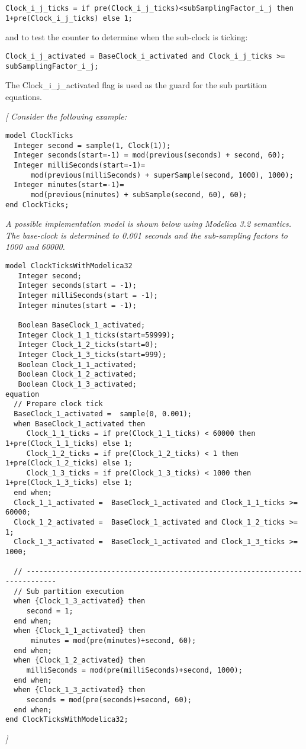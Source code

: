 \begin{lstlisting}[language=modelica]
Clock_i_j_ticks = if pre(Clock_i_j_ticks)<subSamplingFactor_i_j then 1+pre(Clock_i_j_ticks) else 1;
\end{lstlisting}

and to test the counter to determine when the sub-clock is ticking:
\begin{lstlisting}[language=modelica]
Clock_i_j_activated = BaseClock_i_activated and Clock_i_j_ticks >= subSamplingFactor_i_j;
\end{lstlisting}
The Clock\_i\_j\_activated flag is used as the guard for the sub
partition equations.

\emph{{[} Consider the following example:}

\begin{lstlisting}[language=modelica]
model ClockTicks
  Integer second = sample(1, Clock(1));
  Integer seconds(start=-1) = mod(previous(seconds) + second, 60);
  Integer milliSeconds(start=-1)=
      mod(previous(milliSeconds) + superSample(second, 1000), 1000);
  Integer minutes(start=-1)=
      mod(previous(minutes) + subSample(second, 60), 60);
end ClockTicks;
\end{lstlisting}

\emph{A possible implementation model is shown below using Modelica 3.2
semantics. The base-clock is determined to 0.001 seconds and the
sub-sampling factors to 1000 and 60000.}

\begin{lstlisting}[language=modelica]
model ClockTicksWithModelica32
   Integer second;
   Integer seconds(start = -1);
   Integer milliSeconds(start = -1);
   Integer minutes(start = -1);  

   Boolean BaseClock_1_activated;
   Integer Clock_1_1_ticks(start=59999);
   Integer Clock_1_2_ticks(start=0);
   Integer Clock_1_3_ticks(start=999);
   Boolean Clock_1_1_activated;
   Boolean Clock_1_2_activated;
   Boolean Clock_1_3_activated; 
equation  
  // Prepare clock tick   
  BaseClock_1_activated =  sample(0, 0.001);
  when BaseClock_1_activated then
     Clock_1_1_ticks = if pre(Clock_1_1_ticks) < 60000 then 1+pre(Clock_1_1_ticks) else 1;
     Clock_1_2_ticks = if pre(Clock_1_2_ticks) < 1 then 1+pre(Clock_1_2_ticks) else 1;
     Clock_1_3_ticks = if pre(Clock_1_3_ticks) < 1000 then 1+pre(Clock_1_3_ticks) else 1;
  end when;
  Clock_1_1_activated =  BaseClock_1_activated and Clock_1_1_ticks >= 60000;
  Clock_1_2_activated =  BaseClock_1_activated and Clock_1_2_ticks >= 1;
  Clock_1_3_activated =  BaseClock_1_activated and Clock_1_3_ticks >= 1000; 
 
  // ----------------------------------------------------------------------------- 
  // Sub partition execution   
  when {Clock_1_3_activated} then     
     second = 1;
  end when;
  when {Clock_1_1_activated} then
      minutes = mod(pre(minutes)+second, 60);
  end when;
  when {Clock_1_2_activated} then
     milliSeconds = mod(pre(milliSeconds)+second, 1000);
  end when;
  when {Clock_1_3_activated} then
     seconds = mod(pre(seconds)+second, 60);
  end when;
end ClockTicksWithModelica32;
\end{lstlisting}
\emph{{]}}